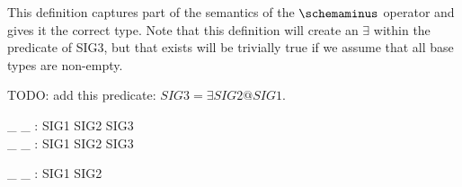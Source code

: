 \documentclass[10pt]{article}
\begin{document}
This definition captures part of the semantics of
the $\schemaminus$ operator and gives it the correct
type.  Note that this definition will create an $\exists$
within the predicate of SIG3, but that exists will be
trivially true if we assume that all base types are non-empty. 

TODO: add this predicate: $SIG3 = \exists SIG2 @ SIG1$.

\begin{gendef}
  \_ \schemaminus \_ : SIG1 \cross SIG2 \fun SIG3 \\
  \_ \schemamerge \_ : SIG1 \cross SIG2 \fun SIG3
\end{gendef}

\begin{gendef}
  \_ \schemaEquals \_ : SIG1 \rel SIG2
\end{gendef}
\end{document}
